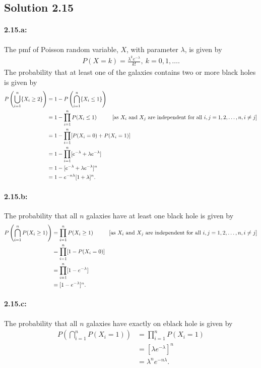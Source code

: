 \subsection*{Solution 2.15}
\paragraph{2.15.a:} The pmf of Poisson random variable, $X$, with parameter $\lambda$, is given by
\begin{align*}
	P(X=k) = \frac{\lambda^ke^{-\lambda}}{k!},\ k=0,1,\ldots.
\end{align*}
The probability that at least one of the galaxies contains two or more black holes is given by
\begin{align*}
	P\left(\bigcup_{i=1}^n\{X_i \geq 2\}\right) &= 1- P\left(\bigcap_{i=1}^n\{X_i \leq 1\}\right)\\
	&= 1- \prod_{i=1}^{n}P(X_i \leq 1)\hspace*{1cm}[\text{as $X_i$ and $X_j$ are independent for all $i,j=1,2,\ldots,n, i \neq j$}]\\
	&= 1- \prod_{i=1}^n [P(X_i=0)+P(X_i=1)]\\
	&= 1- \prod_{i=1}^n [e^{-\lambda}+\lambda e^{-\lambda}]\\
	&= 1- [e^{-\lambda}+\lambda e^{-\lambda}]^n\\
	&= 1- e^{-n\lambda}[1+\lambda]^n.
\end{align*}
\paragraph{2.15.b:}The probability that all $n$ galaxies have at least one black hole is given by
\begin{align*}
	P\left(\bigcap_{i=1}^nP(X_i \geq 1)\right) &= \prod_{i=1}^n P(X_i \geq 1)\hspace*{1cm}[\text{as $X_i$ and $X_j$ are independent for all $i,j=1,2,\ldots,n, i \neq j$}]\\
	&= \prod_{i=1}^n[1-P(X_i =0)]\\
	&= \prod_{i=1}^n [1-e^{-\lambda}]\\
	&= [1-e^{-\lambda}]^n.
\end{align*}
\paragraph{2.15.c:}The probability that all $n$ galaxies have exactly on eblack hole is given by
\begin{align*}
	P\left(\bigcap_{i=1}^n P(X_i = 1)\right) &= \prod_{i=1}^n P(X_i=1)\\
	&= [\lambda e^{-\lambda}]^n\\
	&= \lambda^{n}e^{-n\lambda}.
\end{align*}
